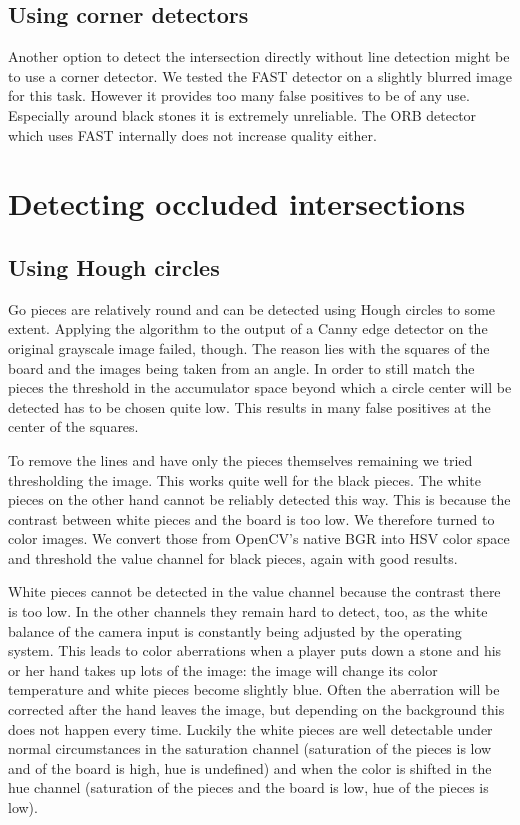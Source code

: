 	\subsection{Using corner detectors}
	\label{detector-visible-corners}
	Another option to detect the intersection directly without line detection might be to use a corner detector. We tested the FAST \cite{rosten2006machine} detector on a slightly blurred image for this task. However it provides too many false positives to be of any use. Especially around black stones it is extremely unreliable. The ORB detector which uses FAST internally does not increase quality either.

	\section{Detecting occluded intersections}
	\subsection{Using Hough circles}
	\label{detector-occluded-hough}
	Go pieces are relatively round and can be detected using Hough circles to some extent. Applying the algorithm to the output of a Canny edge detector on the original grayscale image failed, though. The reason lies with the squares of the board and the images being taken from an angle. In order to still match the pieces the threshold in the accumulator space beyond which a circle center will be detected has to be chosen quite low. This results in many false positives at the center of the squares.

	To remove the lines and have only the pieces themselves remaining we tried thresholding the image. This works quite well for the black pieces. The white pieces on the other hand cannot be reliably detected this way. This is because the contrast between white pieces and the board is too low. We therefore turned to color images. We convert those from OpenCV's native BGR into HSV color space and threshold the value channel for black pieces, again with good results.

	White pieces cannot be detected in the value channel because the contrast there is too low. In the other channels they remain hard to detect, too, as the white balance of the camera input is constantly being adjusted by the operating system. This leads to color aberrations when a player puts down a stone and his or her hand takes up lots of the image: the image will change its color temperature and white pieces become slightly blue. Often the aberration will be corrected after the hand leaves the image, but depending on the background this does not happen every time. Luckily the white pieces are well detectable under normal circumstances in the saturation channel (saturation of the pieces is low and of the board is high, hue is undefined) and when the color is shifted in the hue channel (saturation of the pieces and the board is low, hue of the pieces is low).

